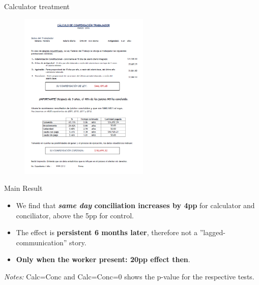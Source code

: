 \documentclass[9pt]{beamer}
\begin{document}
\begin{frame}{Calculator treatment}

    \begin{figure}[H]
    \label{calc_template}
    \begin{center}
        \includegraphics[width=0.55\textwidth]{calctreat.png}
        \end{center}
\end{figure}
\end{frame}




\begin{frame}{Main Result}
    \begin{itemize}
        \item We find that \textbf{\textit{same day} conciliation increases by 4pp} for calculator and conciliator, above the 5pp for control.
        \vspace{0.05in}
        \item The effect is \textbf{persistent 6 months later}, therefore not a ''lagged-communication'' story. 
        \vspace{0.05in}
        \item \textbf{Only when the worker present: 20pp effect then}.
    \end{itemize}
  \hskip-6.0cm\begin{table}
    \label{Table_effects_F}
    \tiny{}
\end{table}
    \footnotesize
    \textit{Notes:} 
    Calc=Conc and Calc=Conc=0 shows the p-value for the respective tests.
\end{frame}
\end{document}
